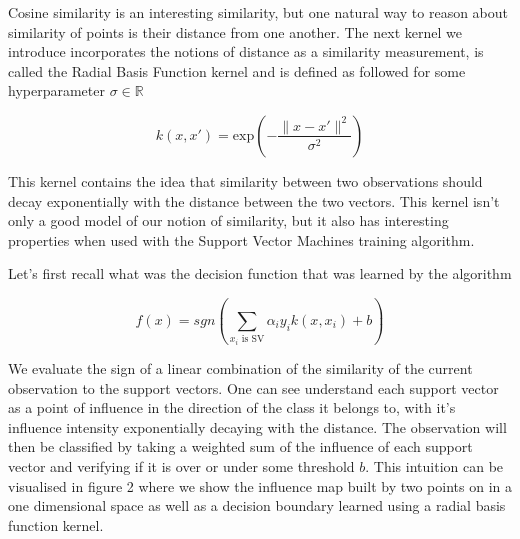 Cosine similarity is an interesting similarity, but one natural way to reason about similarity of points is their distance from one another. The next kernel we introduce incorporates the notions of distance as a similarity measurement, is called the Radial Basis Function kernel and is defined as followed for some hyperparameter $\sigma \in \mathbb{R}$

\begin{equation*}
  k\left(x, x'\right) = \text{exp}\left(-\frac{\|x - x'\|^2}{\sigma^2}\right)
\end{equation*}

This kernel contains the idea that similarity between two observations should decay exponentially with the distance between the two vectors. This kernel isn't only a good model of our notion of similarity, but it also has interesting properties when used with the Support Vector Machines training algorithm.

Let's first recall what was the decision function that was learned by the algorithm

\begin{equation*}
  f\left(x\right) = sgn\left(\sum_{x_i \text{ is SV}}\alpha_iy_ik\left(x, x_i\right) + b\right)
\end{equation*}

We evaluate the sign of a linear combination of the similarity of the current observation to the support vectors. One can see understand each support vector as a point of influence in the direction of the class it belongs to, with it's influence intensity exponentially decaying with the distance. The observation will then be classified by taking a weighted sum of the influence of each support vector and verifying if it is over or under some threshold $b$. This intuition can be visualised in figure 2 where we show the influence map built by two points on in a one dimensional space as well as a decision boundary learned using a radial basis function kernel.



